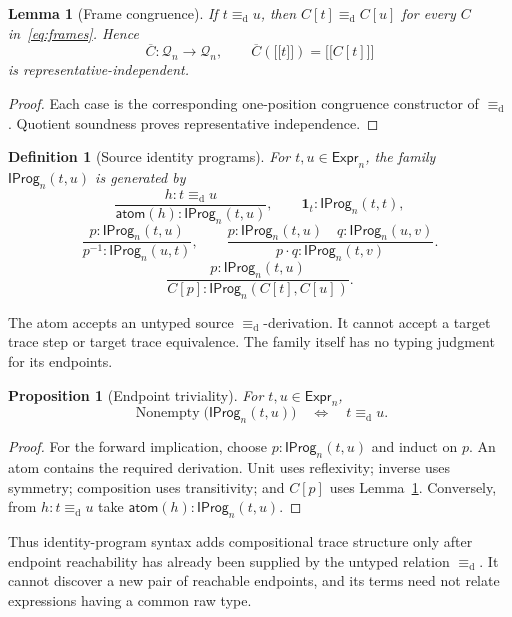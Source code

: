 \documentclass[10pt,reqno]{amsart}
\newtheorem{proposition}[theorem]{Proposition}
\newtheorem{lemma}[theorem]{Lemma}
\newtheorem{definition}[theorem]{Definition}
\newcommand{\Expr}{\mathsf{Expr}}
\newcommand{\IProg}{\mathsf{IProg}}
\newcommand{\den}[1]{\mathopen{\lbrack\!\lbrack}#1\mathclose{\rbrack\!\rbrack}}
\newcommand{\defeq}{\mathrel{\equiv_{\mathrm d}}}
\newcommand{\Q}{\mathcal{Q}}
\begin{document}
\begin{lemma}[Frame congruence]
\label{lem:frame-congruence}
If \(t\defeq u\), then \(C[t]\defeq C[u]\) for every
\(C\) in~\eqref{eq:frames}.  Hence
\[
 \overline C:\Q_n\to\Q_n,\qquad
 \overline C(\den t)=\den{C[t]}
\]
is representative-independent.
\end{lemma}

\begin{proof}
Each case is the corresponding one-position congruence constructor of
\(\defeq\).  Quotient soundness proves representative independence.
\end{proof}

\begin{definition}[Source identity programs]
\label{def:identity-programs}
For \(t,u\in\Expr_n\), the family \(\IProg_n(t,u)\) is generated by
\[
\frac{h:t\defeq u}{\mathsf{atom}(h):\IProg_n(t,u)},\qquad
\mathbf{1}_t:\IProg_n(t,t),
\]
\[
\frac{p:\IProg_n(t,u)}{p^{-1}:\IProg_n(u,t)},\qquad
\frac{p:\IProg_n(t,u)\quad q:\IProg_n(u,v)}
     {p\cdot q:\IProg_n(t,v)}.
\]
\[
\frac{p:\IProg_n(t,u)}
     {C[p]:\IProg_n(C[t],C[u])}.
\]
\end{definition}

The atom accepts an untyped source \(\defeq\)-derivation.  It cannot accept a
target trace step or target trace equivalence.  The family itself has no
typing judgment for its endpoints.

\begin{proposition}[Endpoint triviality]
\label{prop:iprogram-endpoints}
For \(t,u\in\Expr_n\),
\[
 \operatorname{Nonempty}\bigl(\IProg_n(t,u)\bigr)
 \quad\Longleftrightarrow\quad t\defeq u.
\tag{8.2}\label{eq:iprogram-endpoint-iff}
\]
\end{proposition}

\begin{proof}
For the forward implication, choose \(p:\IProg_n(t,u)\) and induct on
\(p\).  An atom contains the required derivation.  Unit uses reflexivity;
inverse uses symmetry; composition uses transitivity; and \(C[p]\) uses
Lemma~\ref{lem:frame-congruence}.  Conversely, from \(h:t\defeq u\) take
\(\mathsf{atom}(h):\IProg_n(t,u)\).
\end{proof}

Thus identity-program syntax adds compositional trace structure only after
endpoint reachability has already been supplied by the untyped relation
\(\defeq\).  It cannot discover a new pair of reachable endpoints, and its
terms need not relate expressions having a common raw type.
\end{document}
